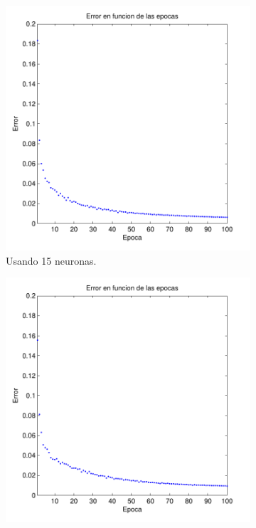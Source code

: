 \documentclass[informe.tex]{subfiles}
\begin{document}
    \begin{figure}
        \centering
        \begin{subfigure}[b]{0.32\textwidth}
                \includegraphics[width=\textwidth]{graficos/error_fold1_15_binary_100_05.pdf}
                \caption{Usando 15 neuronas.}
                \label{fig:d1-f1-05-n15}
        \end{subfigure}
        \begin{subfigure}[b]{0.32\textwidth}
                \includegraphics[width=\textwidth]{graficos/error_fold1_20_binary_100_05.pdf}

\end{subfigure}
\end{figure}
\end{document}
